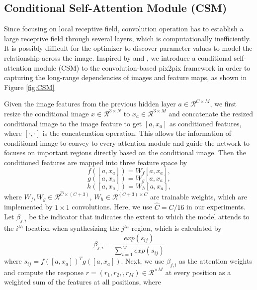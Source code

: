 \subsection{Conditional Self-Attention Module (CSM)}
Since focusing on local receptive field, convolution operation has to establish a large receptive field through several layers, which is computationally inefficiently. It is possibly difficult for the optimizer to discover parameter values to model the relationship across the image. Inspired by \cite{non-local} and \cite{SAGANs}, we introduce a conditional self-attention module (CSM) to the convolution-based pix2pix framework in order to capturing the long-range dependencies of images and feature maps, as shown in Figure \ref{fig:CSM}

Given the image features from the previous hidden layer $a\in \mathcal{R}^{C\times M}$, we first resize the conditional image $x\in \mathcal{R}^{3\times N}$ to  $x_a\in \mathcal{R}^{3\times M}$ and concatenate the resized conditional image to the image feature to get $[a, x_a]$ as conditioned features, where $[\cdot,\cdot]$ is the concatenation operation. This allows the information of conditional image to convey to every attention module and guide the network to focuses on important regions directly based on the conditional image.
%
Then the conditioned features are mapped into three feature space by
\begin{equation}
\label{eqn:f}
f([a, x_a])=W_f[a, x_a],
\end{equation}
\begin{equation}
\label{eqn:g}
g([a, x_a])=W_g[a, x_a],
\end{equation}
\begin{equation}
\label{eqn:h}
h([a, x_a])=W_h[a, x_a],
\end{equation}
where $W_f, W_g\in \mathcal{R}^{\hat{C}\times (C+3)}$, $W_h\in \mathcal{R}^{(C+3)\times C}$ are trainable weights, which are implemented by $1\times 1$ convolutions. Here, we use $\hat{C}=C/16$ in our experiments. 
%
Let $\beta_{j,i}$ be the indicator that indicates the extent to which the model attends to the $i^{th}$ location when synthesizing the $j^{th}$ region, which is calculated by 
\begin{equation}
\label{eqn:beta}
\beta_{j,i}=\frac{exp(s_{ij})}{\sum^M_{i=1}exp(s_{ij})}
\end{equation}
where $s_{ij}=f([a, x_a])^Tg([a, x_a])$. Next, we use $\beta_{j,i}$ as the attention weights and compute the response $r=(r_1, r_2,\dot, r_M)\in \mathcal{R}^{\times M}$ at every position as a weighted sum of the features at all positions, where
